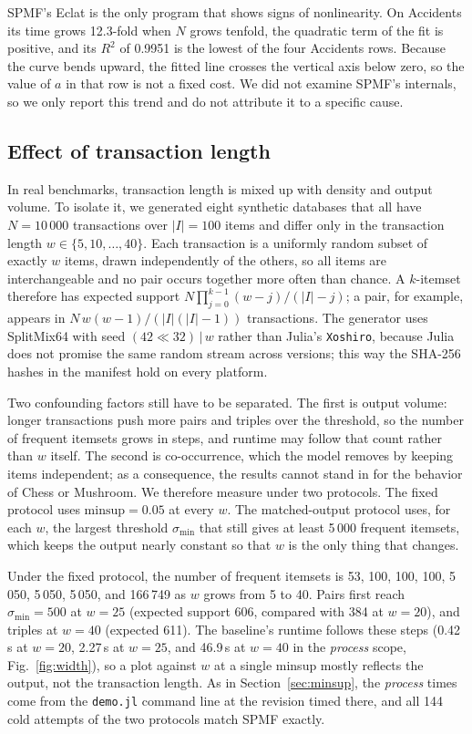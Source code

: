 SPMF's Eclat is the only program that shows signs of nonlinearity. On Accidents its time
grows 12.3-fold when $N$ grows tenfold, the quadratic term of the fit is positive, and its
$R^2$ of 0.9951 is the lowest of the four Accidents rows. Because the curve bends upward,
the fitted line crosses the vertical axis below zero, so the value of $a$ in that row is
not a fixed cost. We did not examine SPMF's internals, so we only report this trend and do
not attribute it to a specific cause.

\subsection{Effect of transaction length}
\label{sec:width}
In real benchmarks, transaction length is mixed up with density and output volume. To
isolate it, we generated eight synthetic databases that all have $N = 10\,000$
transactions over $|I| = 100$ items and differ only in the transaction length
$w \in \{5, 10, \dots, 40\}$. Each transaction is a uniformly random subset of exactly $w$
items, drawn independently of the others, so all items are interchangeable and no pair
occurs together more often than chance. A $k$-itemset therefore has expected support
$N \prod_{j=0}^{k-1} (w - j)/(|I| - j)$; a pair, for example, appears in
$N\,w(w-1)/(|I|(|I|-1))$ transactions. The generator uses SplitMix64 with seed
$(42 \ll 32) \,|\, w$ rather than Julia's \texttt{Xoshiro}, because Julia does not promise
the same random stream across versions; this way the SHA-256 hashes in the manifest hold on
every platform.

Two confounding factors still have to be separated. The first is output volume: longer
transactions push more pairs and triples over the threshold, so the number of frequent
itemsets grows in steps, and runtime may follow that count rather than $w$ itself. The
second is co-occurrence, which the model removes by keeping items independent; as a
consequence, the results cannot stand in for the behavior of Chess or Mushroom. We
therefore measure under two protocols. The fixed protocol uses $\mathrm{minsup} = 0.05$ at
every $w$. The matched-output protocol uses, for each $w$, the largest threshold
$\sigma_{\min}$ that still gives at least 5\,000 frequent itemsets, which keeps the output
nearly constant so that $w$ is the only thing that changes.

Under the fixed protocol, the number of frequent itemsets is 53, 100, 100, 100, 5\,050,
5\,050, 5\,050, and 166\,749 as $w$ grows from 5 to 40. Pairs first reach
$\sigma_{\min} = 500$ at $w = 25$ (expected support 606, compared with 384 at $w = 20$),
and triples at $w = 40$ (expected 611). The baseline's runtime follows these steps
(0.42\,s at $w = 20$, 2.27\,s at $w = 25$, and 46.9\,s at $w = 40$ in the \emph{process}
scope, Fig.~\ref{fig:width}), so a plot against $w$ at a single minsup mostly reflects the
output, not the transaction length. As in Section~\ref{sec:minsup}, the \emph{process}
times come from the \texttt{demo.jl} command line at the revision timed there, and all 144
cold attempts of the two protocols match SPMF exactly.

